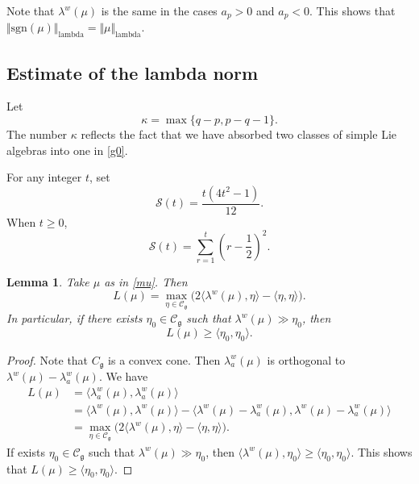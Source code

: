 \documentclass[11pt]{amsart}
\theoremstyle{plain}
\newtheorem{lemma}[thm]{Lemma}
\theoremstyle{definition}
\newcommand{\mfg}{\mathfrak{g}}
\newcommand{\C}{\mathcal{C}}
\newcommand{\caS}{\mathcal{S}}
\begin{document}
Note that $\lambda^w(\mu)$ is the same in the cases $a_p>0$ and $a_p<0$. This shows that $\Vert \mathrm{sgn}(\mu)\Vert_{\mathrm{lambda}}=\Vert \mu\Vert_{\mathrm{lambda}}$.

\subsection{Estimate of the lambda norm}
Let
\begin{equation}\label{kappa}
\kappa=\max\{q-p,p-q-1\}.
\end{equation}
The number $\kappa$ reflects the fact that we have absorbed two classes of simple Lie algebras into one in \eqref{g0}.

For any integer $t$, set
\begin{equation}\label{S}
	\caS(t)=\frac{t(4t^2-1)}{12}.
\end{equation}
When $t\ge 0$,
\[\caS(t)=\sum_{r=1}^t \left(r-\frac{1}{2}\right)^2.\]
\begin{lemma}\label{lambda-lem}
	Take $\mu$ as in \eqref{mu}. Then
	\[L(\mu)=\max_{\eta\in \C_\mfg}\big(2\langle \lambda^w(\mu),\eta\rangle-\langle\eta,\eta\rangle\big).\]
	In particular, if there exists $\eta_0\in \C_\mfg$ such that $\lambda^w(\mu)\gg \eta_0$, then
	\[L(\mu)\ge \langle\eta_0,\eta_0\rangle.\]
\end{lemma}

\begin{proof}
	Note that $C_\mfg$ is a convex cone. Then $\lambda_a^w(\mu)$ is orthogonal to $\lambda^w(\mu)-\lambda_a^w(\mu)$. We have
	\begin{align*}
		L(\mu)&=\langle \lambda_a^w(\mu), \lambda_a^w(\mu)\rangle\\
		&=\langle \lambda^w(\mu), \lambda^w(\mu)\rangle-\langle\lambda^w(\mu)-\lambda_a^w(\mu), \lambda^w(\mu)-\lambda_a^w(\mu)\rangle\\
		&= \max_{\eta\in \C_\mfg}\big(2\langle \lambda^w(\mu),\eta\rangle-\langle\eta,\eta\rangle\big).
	\end{align*}
	If exists $\eta_0\in \C_\mfg$ such that $\lambda^w(\mu)\gg \eta_0$, then $\langle \lambda^w(\mu), \eta_0\rangle\ge \langle\eta_0, \eta_0\rangle$. This shows that $L(\mu)\ge \langle\eta_0,\eta_0\rangle$.
\end{proof}
\end{document}
